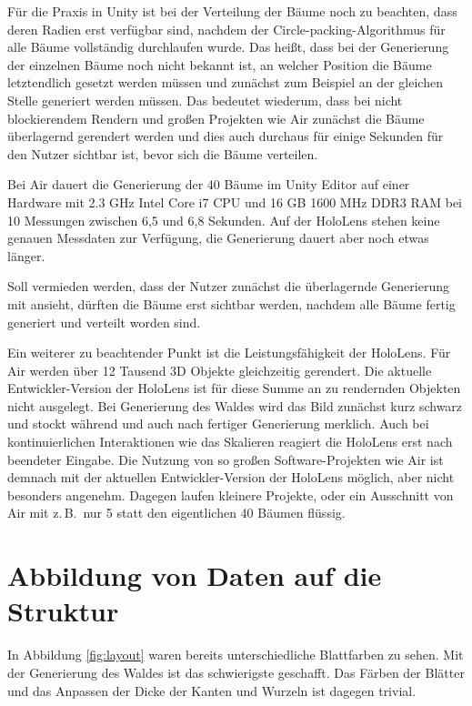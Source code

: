 Für die Praxis in Unity ist bei der Verteilung der Bäume noch zu beachten, dass deren Radien erst verfügbar sind, nachdem der Circle-packing-Algorithmus für alle Bäume vollständig durchlaufen wurde. Das heißt, dass bei der Generierung der einzelnen Bäume noch nicht bekannt ist, an welcher Position die Bäume letztendlich gesetzt werden müssen und zunächst zum Beispiel an der gleichen Stelle generiert werden müssen. Das bedeutet wiederum, dass bei nicht blockierendem Rendern und großen Projekten wie Air zunächst die Bäume überlagernd gerendert werden und dies auch durchaus für einige Sekunden für den Nutzer sichtbar ist, bevor sich die Bäume verteilen.

Bei Air dauert die Generierung der 40 Bäume im Unity Editor auf einer Hardware mit 2.3 GHz Intel Core i7 CPU und 16 GB 1600 MHz DDR3 RAM bei 10 Messungen zwischen 6,5 und 6,8 Sekunden. Auf der HoloLens stehen keine genauen Messdaten zur Verfügung, die Generierung dauert aber noch etwas länger.

Soll vermieden werden, dass der Nutzer zunächst die überlagernde Generierung mit ansieht, dürften die Bäume erst sichtbar werden, nachdem alle Bäume fertig generiert und verteilt worden sind.

Ein weiterer zu beachtender Punkt ist die Leistungsfähigkeit der HoloLens. Für Air werden über 12 Tausend 3D Objekte gleichzeitig gerendert. Die aktuelle Entwickler-Version der HoloLens ist für diese Summe an zu rendernden Objekten nicht ausgelegt. Bei Generierung des Waldes wird das Bild zunächst kurz schwarz und stockt während und auch nach fertiger Generierung merklich. Auch bei kontinuierlichen Interaktionen wie das Skalieren reagiert die HoloLens erst nach beendeter Eingabe. Die Nutzung von so großen Software-Projekten wie Air ist demnach mit der aktuellen Entwickler-Version der HoloLens möglich, aber nicht besonders angenehm. Dagegen laufen kleinere Projekte, oder ein Ausschnitt von Air mit z.\,B.\ nur 5 statt den eigentlichen 40 Bäumen flüssig.

\section{Abbildung von Daten auf die Struktur}
\label{sec:data}

In Abbildung \ref{fig:layout} waren bereits unterschiedliche Blattfarben zu sehen. Mit der Generierung des Waldes ist das schwierigste geschafft. Das Färben der Blätter und das Anpassen der Dicke der Kanten und Wurzeln ist dagegen trivial.

